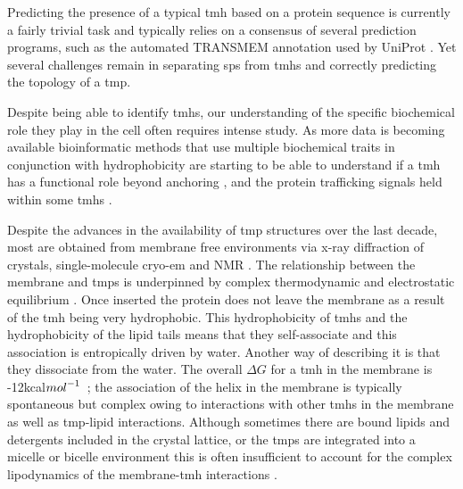 Predicting the presence of a typical \gls{tmh} based on a protein sequence is currently a fairly trivial task and typically relies on a consensus of several prediction programs, such as the automated TRANSMEM annotation used by UniProt \cite{TheUniProtConsortium2014}.
Yet several challenges remain in separating \gls{sp}s from \gls{tmh}s \cite{Petersen2011} and correctly predicting the topology of a \gls{tmp}.

Despite being able to identify \gls{tmh}s, our understanding of the specific biochemical role they play in the cell often requires intense study.
As more data is becoming available bioinformatic methods that use multiple biochemical traits in conjunction with hydrophobicity are starting to be able to understand if a \gls{tmh} has a functional role beyond anchoring \cite{Wong2011, Wong2012}, and the protein trafficking signals held within some \gls{tmh}s \cite{Guna2018}.

Despite the advances in the availability of \gls{tmp} structures over the last decade, most are obtained from membrane free environments via x\--ray diffraction of crystals, single\--molecule cryo\--\gls{em} and NMR \cite{Vinothkumar2015, Stansfeld2015}.
The relationship between the membrane and \gls{tmp}s is underpinned by complex thermodynamic and  electrostatic equilibrium \cite{Cymer2015}.
Once inserted the protein does not leave the membrane as a result of the \gls{tmh} being very hydrophobic.
This hydrophobicity of \gls{tmh}s and the hydrophobicity of the lipid tails means that they self\--associate and this association is entropically driven by water.
Another way of describing it is that they dissociate from the water.
The overall $\Delta G$ for a \gls{tmh} in the membrane is -12kcal${mol}^{\--1}$~\cite{Cymer2015}; the association of the helix in the membrane is typically spontaneous but complex owing to interactions with other \gls{tmh}s in the membrane as well as \gls{tmp}\--lipid interactions.
Although sometimes there are bound lipids and detergents included in the crystal lattice, or the \gls{tmp}s are integrated into a micelle or bicelle environment this is often insufficient to account for the complex lipodynamics of the membrane\--\gls{tmh} interactions \cite{Coskun2011, Stansfeld2015}.

